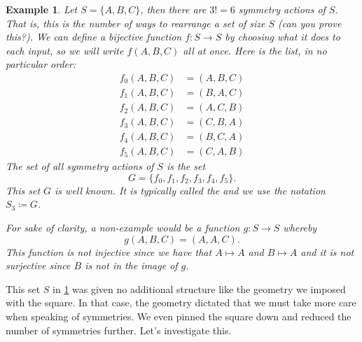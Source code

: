 \documentclass{article}
\theoremstyle{indented}
\newtheorem{example}{Example}
\begin{document}
\begin{example}
\label{ex:s3}
Let $S = \{A,B,C\}$, then there are $3!=6$ symmetry actions of $S$. That is, this is the number of ways to rearrange a set of size $S$ (can you prove this?). We can define a bijective function $f\colon S \to S$ by choosing what it does to each input, so we will write $f(A,B,C)$ all at once. Here is the list, in no particular order:
\begin{align*}
    f_0(A,B,C) &= (A,B,C)\\
    f_1(A,B,C) &= (B,A,C)\\
    f_2(A,B,C) &= (A,C,B)\\
    f_3(A,B,C) &= (C,B,A)\\
    f_4(A,B,C) &= (B,C,A)\\
    f_5(A,B,C) &= (C,A,B)
\end{align*}
The set of all symmetry actions of $S$ is the set
\[
G = \{f_0,f_1,f_2,f_3,f_4,f_5\}.
\]
This set $G$ is well known. It is typically called the  and we use the notation $S_3\coloneqq G$.

For sake of clarity, a non-example would be a function $g\colon S \to S$ whereby
\[
g(A,B,C) = (A,A,C).
\]
This function is not injective since we have that $A\mapsto A$ and $B\mapsto A$ and it is not surjective since $B$ is not in the image of $g$.
\end{example}

This set $S$ in \cref{ex:s3} was given no additional structure like the geometry we imposed with the square. In that case, the geometry dictated that we must take more care when speaking of symmetries. We even pinned the square down and reduced the number of symmetries further. Let's investigate this.
\end{document}
